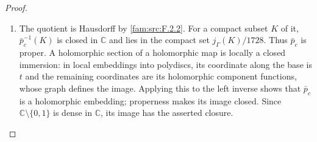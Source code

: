 \begin{proof}
\begin{enumerate}[label=\arabic*.,leftmargin=*]
\item The quotient is Hausdorff by \ref{fam:src:F.2.2}.  For a compact subset $K$ of it,
$\bar p_c^{-1}(K)$ is closed in $\mathbb C$ and lies in the compact set
$j_\Gamma(K)/1728$.  Thus $\bar p_c$ is proper.  A holomorphic section of
a holomorphic map is locally a closed immersion: in local embeddings
into polydiscs, its coordinate along the base is $t$ and the remaining
coordinates are its holomorphic component functions, whose graph
defines the image.  Applying this to the left inverse shows that
$\bar p_c$ is a holomorphic embedding; properness makes its image
closed.  Since $\mathbb C\setminus\{0,1\}$ is dense in $\mathbb C$, its
image has the asserted closure.
\end{enumerate}
\end{proof}